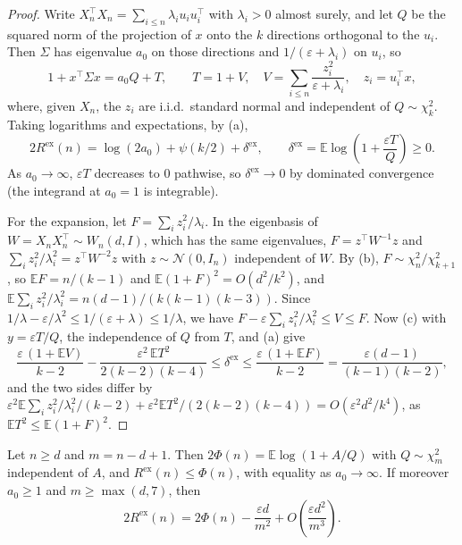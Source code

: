 \documentclass[10pt]{article}
\newcommand{\E}{\mathbb{E}}
\begin{document}
\begin{proof}
Write $X_n^\top X_n = \sum_{i \le n} \lambda_i u_i u_i^\top$ with $\lambda_i > 0$ almost surely, and let $Q$ be the squared norm of the projection of $x$ onto the $k$ directions orthogonal to the $u_i$. Then $\Sigma$ has eigenvalue $a_0$ on those directions and $1/(\varepsilon + \lambda_i)$ on $u_i$, so
\[
1 + x^\top \Sigma x = a_0 Q + T, \qquad T = 1 + V, \quad V = \sum_{i \le n} \frac{z_i^2}{\varepsilon + \lambda_i}, \quad z_i = u_i^\top x,
\]
where, given $X_n$, the $z_i$ are i.i.d.\ standard normal and independent of $Q \sim \chi^2_k$. Taking logarithms and expectations, by (a),
\[
2R^{\mathrm{ex}}(n) = \log(2a_0) + \psi(k/2) + \delta^{\mathrm{ex}}, \qquad \delta^{\mathrm{ex}} = \E \log\!\left(1 + \frac{\varepsilon T}{Q}\right) \ge 0 .
\]
As $a_0 \to \infty$, $\varepsilon T$ decreases to $0$ pathwise, so $\delta^{\mathrm{ex}} \to 0$ by dominated convergence (the integrand at $a_0 = 1$ is integrable).

For the expansion, let $F = \sum_i z_i^2 / \lambda_i$. In the eigenbasis of $W = X_n X_n^\top \sim W_n(d, I)$, which has the same eigenvalues, $F = z^\top W^{-1} z$ and $\sum_i z_i^2/\lambda_i^2 = z^\top W^{-2} z$ with $z \sim \mathcal{N}(0, I_n)$ independent of $W$. By (b), $F \sim \chi^2_n / \chi^2_{k+1}$, so $\E F = n/(k-1)$ and $\E (1+F)^2 = O(d^2/k^2)$, and $\E \sum_i z_i^2/\lambda_i^2 = n(d-1)/(k(k-1)(k-3))$. Since $1/\lambda - \varepsilon/\lambda^2 \le 1/(\varepsilon + \lambda) \le 1/\lambda$, we have $F - \varepsilon \sum_i z_i^2/\lambda_i^2 \le V \le F$. Now (c) with $y = \varepsilon T / Q$, the independence of $Q$ from $T$, and (a) give
\[
\frac{\varepsilon\,(1 + \E V)}{k-2} - \frac{\varepsilon^2\, \E T^2}{2(k-2)(k-4)} \le \delta^{\mathrm{ex}} \le \frac{\varepsilon\,(1 + \E F)}{k-2} = \frac{\varepsilon (d-1)}{(k-1)(k-2)} ,
\]
and the two sides differ by $\varepsilon^2 \E \sum_i z_i^2/\lambda_i^2 /(k-2) + \varepsilon^2 \E T^2 / (2(k-2)(k-4)) = O(\varepsilon^2 d^2 / k^4)$, as $\E T^2 \le \E (1 + F)^2$.
\end{proof}

\begin{lemma}\label{lem:many}
Let $n \ge d$ and $m = n - d + 1$. Then $2\Phi(n) = \E \log(1 + A/Q)$ with $Q \sim \chi^2_m$ independent of $A$, and $R^{\mathrm{ex}}(n) \le \Phi(n)$, with equality as $a_0 \to \infty$. If moreover $a_0 \ge 1$ and $m \ge \max(d, 7)$, then
\[
2R^{\mathrm{ex}}(n) = 2\Phi(n) - \frac{\varepsilon d}{m^2} + O\!\left(\frac{\varepsilon d^2}{m^3}\right).
\]
\end{lemma}
\end{document}
